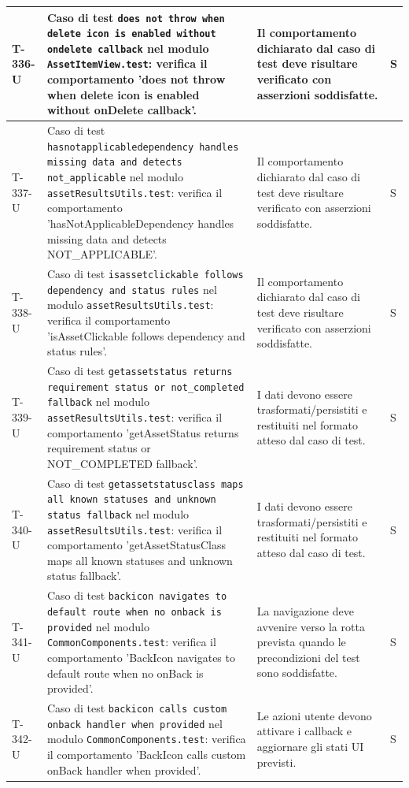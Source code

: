 \documentclass[a4paper,12pt]{article}
\begin{document}
{{\begin{longtable}{|>{\RaggedRight\arraybackslash}p{1.55cm}|>{\RaggedRight\arraybackslash}p{8.0cm}|>{\RaggedRight\arraybackslash}p{4.6cm}|>{\RaggedRight\arraybackslash}p{1.2cm}|}
        \hline
        T-336-U & Caso di test \texttt{does not throw when delete icon is enabled without ondelete callback} nel modulo \texttt{AssetItemView.test}: verifica il comportamento 'does not throw when delete icon is enabled without onDelete callback'. & Il comportamento dichiarato dal caso di test deve risultare verificato con asserzioni soddisfatte. & S \\
        \hline
        T-337-U & Caso di test \texttt{hasnotapplicabledependency handles missing data and detects not\_applicable} nel modulo \texttt{assetResultsUtils.test}: verifica il comportamento 'hasNotApplicableDependency handles missing data and detects NOT\_APPLICABLE'. & Il comportamento dichiarato dal caso di test deve risultare verificato con asserzioni soddisfatte. & S \\
        \hline
        T-338-U & Caso di test \texttt{isassetclickable follows dependency and status rules} nel modulo \texttt{assetResultsUtils.test}: verifica il comportamento 'isAssetClickable follows dependency and status rules'. & Il comportamento dichiarato dal caso di test deve risultare verificato con asserzioni soddisfatte. & S \\
        \hline
        T-339-U & Caso di test \texttt{getassetstatus returns requirement status or not\_completed fallback} nel modulo \texttt{assetResultsUtils.test}: verifica il comportamento 'getAssetStatus returns requirement status or NOT\_COMPLETED fallback'. & I dati devono essere trasformati/persistiti e restituiti nel formato atteso dal caso di test. & S \\
        \hline
        T-340-U & Caso di test \texttt{getassetstatusclass maps all known statuses and unknown status fallback} nel modulo \texttt{assetResultsUtils.test}: verifica il comportamento 'getAssetStatusClass maps all known statuses and unknown status fallback'. & I dati devono essere trasformati/persistiti e restituiti nel formato atteso dal caso di test. & S \\
        \hline
        T-341-U & Caso di test \texttt{backicon navigates to default route when no onback is provided} nel modulo \texttt{CommonComponents.test}: verifica il comportamento 'BackIcon navigates to default route when no onBack is provided'. & La navigazione deve avvenire verso la rotta prevista quando le precondizioni del test sono soddisfatte. & S \\
        \hline
        T-342-U & Caso di test \texttt{backicon calls custom onback handler when provided} nel modulo \texttt{CommonComponents.test}: verifica il comportamento 'BackIcon calls custom onBack handler when provided'. & Le azioni utente devono attivare i callback e aggiornare gli stati UI previsti. & S \\

\end{longtable}}}
\end{document}
